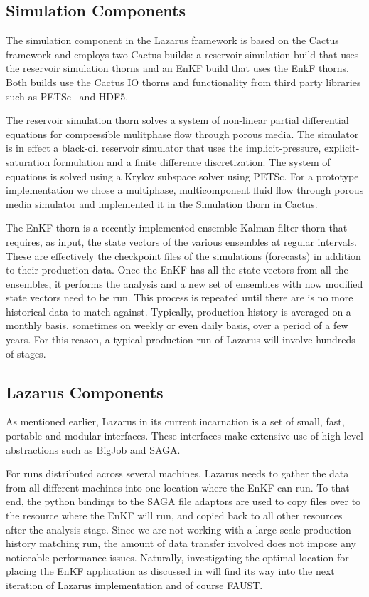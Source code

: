 \documentclass[conference,final]{IEEEtran}
\begin{document}
\subsection{Simulation Components}
The simulation component in the Lazarus framework is based on the
Cactus framework and employs two Cactus builds: a reservoir simulation
build that uses the reservoir simulation thorns and an EnKF build that
uses the EnkF thorns. Both builds use the Cactus IO thorns and
functionality from third party libraries such as PETSc~\cite{PETSc}
and HDF5.

The reservoir simulation thorn solves a system of non-linear partial
differential equations for compressible mulitphase flow through porous
media. The simulator is in effect a black-oil reservoir simulator that
uses the implicit-pressure, explicit-saturation formulation and a
finite difference discretization. The system of equations is solved
using a Krylov subspace solver using PETSc. For a prototype
implementation we chose a multiphase, multicomponent fluid flow
through porous media simulator and implemented it in the Simulation
thorn in Cactus.

The EnKF thorn is a recently implemented ensemble Kalman filter
thorn that requires, as input, the state vectors of the various
ensembles at regular intervals. These are effectively the checkpoint
files of the simulations (forecasts) in addition to their production
data. Once the EnKF has all the state vectors from all the ensembles, 
it performs the analysis and a new set of ensembles with now modified
state vectors need to be run. This process is repeated until there
are is no more historical data to match against. Typically,
production history is averaged on a monthly basis, sometimes on weekly
or even daily basis, over a period of a few years. For this reason,
a typical production run of Lazarus will involve hundreds of stages.

\subsection{Lazarus Components}

As mentioned earlier, Lazarus in its current incarnation is a set of
small, fast, portable and modular interfaces. These interfaces make
extensive use of high level abstractions such as BigJob and SAGA.

For runs distributed across several machines, Lazarus needs to gather
the data from all different machines into one location where the EnKF
can run. To that end, the python bindings to the SAGA file adaptors
are used to copy files over to the resource where the EnKF will run,
and copied back to all other resources after the analysis stage. Since
we are not working with a large scale production history matching run,
the amount of data transfer involved does not impose any noticeable
performance issues. Naturally, investigating the optimal location for
placing the EnKF application as discussed in \cite{escience07} will
find its way into the next iteration of Lazarus implementation and of
course FAUST.
\end{document}
